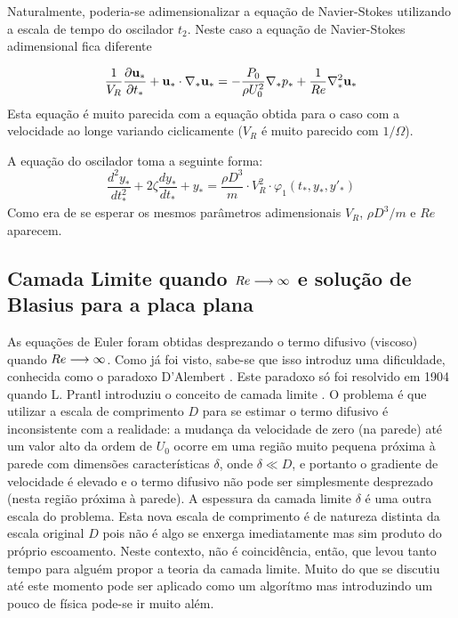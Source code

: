 Naturalmente, poderia-se adimensionalizar a equação de Navier-Stokes utilizando a escala de tempo do oscilador $t_2$. Neste caso a equação de Navier-Stokes adimensional fica diferente 

\[
\frac{1}{V_R}\frac{\partial \mathbf{u}_*}{\partial t_*} +  \mathbf{u}_*\cdot\nabla_* \mathbf{u_*} = -\frac{P_0}{\rho U_0^2}\nabla_* p_* + \frac{1}{Re}\nabla_*^2 \mathbf{u}_* 
\]
Esta equação é muito parecida com a equação obtida para o caso com a velocidade ao longe variando ciclicamente ($V_R$ é muito parecido com $1/\Omega$). 

A equação do oscilador toma a seguinte forma:
\[
\frac{d^2y_*}{dt_*^2} + 2\zeta\frac{dy_*}{dt_*} + y_* = \frac{\rho D^3}{m} \cdot V_R^2 \cdot \varphi_1\left(t_*, y_*, y'_*\right)
\]
Como era de se esperar os mesmos parâmetros adimensionais $V_R$, $\rho D^3/m$ e $Re$ aparecem.

\subsection{Camada Limite quando $Re\longrightarrow\infty$ e solução de Blasius para a placa plana}

As equações de Euler foram obtidas desprezando o termo difusivo (viscoso) quando $Re\longrightarrow\infty$. Como já foi visto,  sabe-se que isso introduz uma dificuldade, conhecida como o paradoxo D'Alembert \cite{Birkhoff60}. Este paradoxo só foi resolvido em 1904 quando L. Prantl introduziu  o conceito de camada limite \cite{Birkhoff60}. O problema é que utilizar a escala de comprimento $D$ para se estimar o termo difusivo é inconsistente com a realidade: a mudança da velocidade de zero (na parede) até um valor alto da ordem de $U_0$ ocorre em uma região muito pequena próxima à parede com dimensões características $\delta$, onde $\delta \ll D$, e portanto o  gradiente de velocidade é elevado e o termo difusivo não pode ser simplesmente desprezado (nesta região próxima à parede). A espessura da camada limite $\delta$ é uma outra escala do problema. Esta nova escala de comprimento é de natureza distinta da escala original $D$ pois não é algo se enxerga imediatamente mas sim produto do próprio escoamento. Neste contexto,  não é coincidência, então, que levou tanto tempo para alguém propor a teoria da camada limite. Muito do que se discutiu até este momento pode ser aplicado como um algorítmo mas introduzindo um pouco de física pode-se ir muito além.


